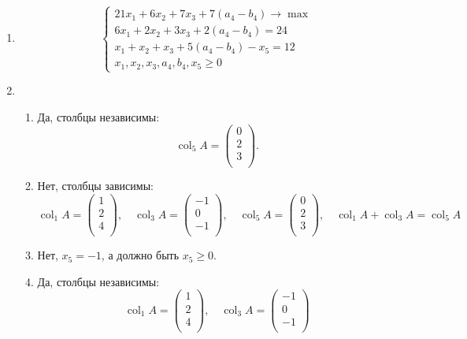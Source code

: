 \documentclass[12pt]{article}
\DeclareMathOperator{\col}{col}
\begin{document}
\begin{enumerate}
\item 
\[
\begin{cases}
  21x_1 + 6x_2 + 7x_3 + 7(a_4 - b_4) \to \max \\
  6x_1 + 2x_2 + 3x_3 + 2(a_4 - b_4) = 24 \\
  x_1 + x_2 + x_3 + 5(a_4 - b_4) - x_5 = 12 \\
  x_1, x_2, x_3, a_4, b_4, x_5 \geq 0    
\end{cases}
\]

\item 
\begin{enumerate}
  \item Да, столбцы независимы:
  \[
  \col_5 A = \begin{pmatrix}
    0 \\ 
    2 \\ 
    3 \\
  \end{pmatrix}.
  \]
  \item Нет, столбцы зависимы:
  \[
  \col_1 A = \begin{pmatrix}
    1 \\
    2 \\
    4 \\
  \end{pmatrix}, \quad 
  \col_3 A = \begin{pmatrix}
    -1 \\
    0 \\
    -1 \\
  \end{pmatrix}, \quad 
  \col_5 A = \begin{pmatrix}
    0 \\ 
    2 \\ 
    3 \\
  \end{pmatrix}, \quad 
  \col_1 A + \col_3 A = \col_5 A
  \]
  \item Нет, $x_5  = -1$, а должно быть $x_5 \geq 0$. 
  \item Да, столбцы независимы:
  \[
    \col_1 A = \begin{pmatrix}
      1 \\
      2 \\
      4 \\
    \end{pmatrix}, \quad 
    \col_3 A = \begin{pmatrix}
      -1 \\
      0 \\
      -1 \\
    \end{pmatrix}
  \]

\end{enumerate}



\end{enumerate}
\end{document}
